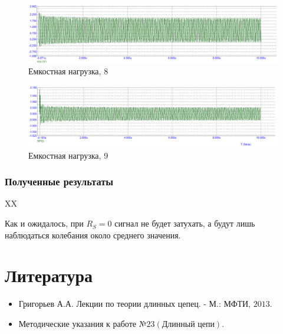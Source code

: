 \documentclass[a4paper, 14pt]{extarticle}%
\begin{document}
\newpage 

\begin{figure}[h!]
			\centering
			\includegraphics[width=1.1\linewidth]{./graphs/27.jpg}
			\caption{Емкостная нагрузка, 8}
			\label{5.8}
\end{figure}

\begin{figure}[h!]
			\centering
			\includegraphics[width=1.1\linewidth]{./graphs/28.jpg}
			\caption{Емкостная нагрузка, 9}
			\label{5.9}
\end{figure}

\subsubsection{Полученные результаты}

XX

Как и ожидалось, при $R_{S}=0$ сигнал не будет затухать, а будут лишь наблюдаться колебания около среднего значения.


\section{Литература}

\begin{itemize}

\item Григорьев А.А. Лекции по теории длинных цепец. - М.: МФТИ, $2013 .$

\item Методические указания к работе №$23 (\text{Длинный цепи})$.

\end{itemize}
\end{document}

